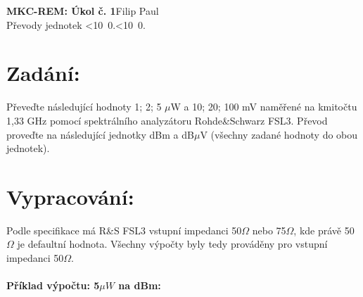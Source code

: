 \documentclass[10pt, a4paper]{article}%
\def\mydate{\leavevmode\hbox{\twodigits\day.\twodigits\month.\the\year}}
\def\twodigits#1{\ifnum#1<10 0\fi\the#1}
\begin{document}
\begin{flushleft}%
	\textbf{\Large{MKC-REM: Úkol č. 1}}\hfill Filip Paul\\
	\large{Převody jednotek \hfill\mydate}
\end{flushleft}
	\section*{\Large Zadání:}
	Převeďte následující hodnoty 1; 2; 5 $\mu$W a 10; 20; 100 mV naměřené na kmitočtu 1,33 GHz pomocí
	spektrálního analyzátoru Rohde\&Schwarz FSL3. Převod proveďte na následující jednotky dBm
	a dB$\mu$V (všechny zadané hodnoty do obou jednotek).	
	\section*{\Large Vypracování:}
	Podle specifikace má R\&S FSL3 vstupní impedanci 50$\Omega$ nebo 75$\Omega$, kde právě 50$\Omega$ je
	defaultní hodnota. Všechny výpočty byly tedy prováděny pro vstupní impedanci 50$\Omega$.
	\\\\
	\textbf{Příklad výpočtu: 5$\mu W$ na dBm:}\\
\end{document}
